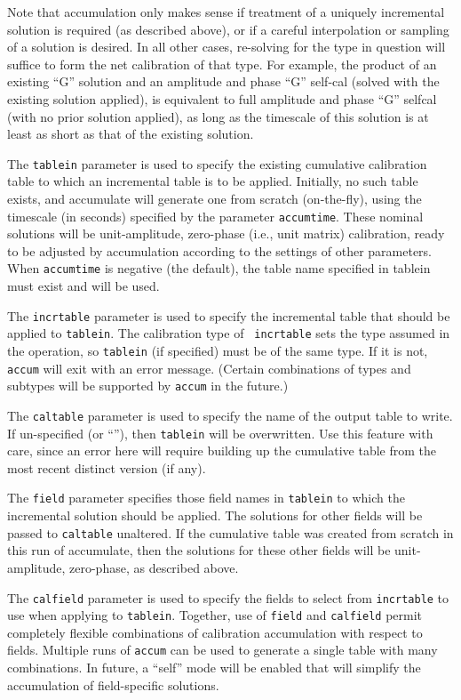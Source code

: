 Note that accumulation only makes sense if treatment of a uniquely
incremental solution is required (as described above), or if a careful
interpolation or sampling of a solution is desired. In all other cases,
re-solving for the type in question will suffice to form the net
calibration of that type. For example, the product of an existing ``G''
solution and an amplitude and phase ``G'' self-cal (solved with the
existing solution applied), is equivalent to full amplitude and phase
``G'' selfcal (with no prior solution applied), as long as the timescale
of this solution is at least as short as that of the existing solution.

The {\tt tablein} parameter is used to specify the existing cumulative
calibration table to which an incremental table is to be applied.
Initially, no such table exists, and accumulate will generate one from
scratch (on-the-fly), using the timescale (in seconds) specified by
the parameter {\tt accumtime}. These nominal solutions will be
unit-amplitude, zero-phase (i.e., unit matrix) calibration, ready to
be adjusted by accumulation according to the settings of other
parameters.  When {\tt accumtime} is negative (the default), the table
name specified in tablein must exist and will be used.

The {\tt incrtable} parameter is used to specify the incremental table
that should be applied to {\tt tablein}. The calibration type of {\tt
incrtable} sets the type assumed in the operation, so {\tt tablein}
(if specified) must be of the same type. If it is not, {\tt accum}
will exit with an error message. (Certain combinations of types and
subtypes will be supported by {\tt accum} in the future.)

The {\tt caltable} parameter is used to specify the name of the output
table to write. If un-specified (or ``''), then {\tt tablein} will be
overwritten. Use this feature with care, since an error here will
require building up the cumulative table from the most recent distinct
version (if any).

The {\tt field} parameter specifies those field names in {\tt tablein} to
which the incremental solution should be applied. The solutions for
other fields will be passed to {\tt caltable} unaltered. If the cumulative
table was created from scratch in this run of accumulate, then the
solutions for these other fields will be unit-amplitude, zero-phase,
as described above.

The {\tt calfield} parameter is used to specify the fields to select
from {\tt incrtable} to use when applying to {\tt tablein}. Together,
use of {\tt field} and {\tt calfield} permit completely flexible combinations
of calibration accumulation with respect to fields. Multiple runs of
{\tt accum} can be used to generate a single table with many combinations.
In future, a ``self'' mode will be enabled that will simplify the
accumulation of field-specific solutions.

